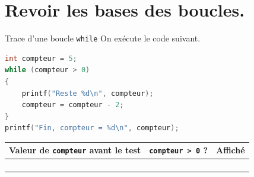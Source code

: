 \section{Revoir les bases des boucles.}
\begin{UPSTIexercice}{Trace d'une boucle \texttt{while}}
    On exécute le code suivant.
    \begin{lstlisting}[language=C]
int compteur = 5;
while (compteur > 0)
{
    printf("Reste %d\n", compteur);
    compteur = compteur - 2;
}
printf("Fin, compteur = %d\n", compteur);
\end{lstlisting}

    \begin{center}
        \begin{tabular}{|c|c|p{4cm}|}
            \hline
            \textbf{Valeur de \texttt{compteur} avant le test} & \textbf{\texttt{compteur > 0} ?} & \textbf{Affiché} \\
            \hline
             & & \\[0.3cm]
            \hline
             & & \\[0.3cm]
            \hline
             & & \\[0.3cm]
            \hline
             & & \\[0.3cm]
            \hline
        \end{tabular}
    \end{center}
\end{UPSTIexercice}

